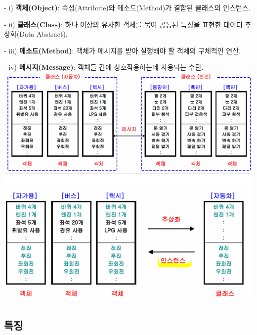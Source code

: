 \documentclass[a4paper,12pt]{article}
\begin{document}
- i) \textbf{객체(Object)}: 속성(Attribute)와 메소드(Method)가 결합된 클래스의 인스턴스.

- ii) \textbf{클래스(Class)}: 하나 이상의 유사한 객체를 묶어 공통된 특성을 표현한 데이터 추상화(Data Abstract).

- iii) \textbf{메소드(Method)}: 객체가 메시지를 받아 실행해야 할 객체의 구체적인 연산.

- iv) \textbf{메시지(Message)}: 객체들 간에 상호작용하는데 사용되는 수단.
\newline
\newline
\includegraphics[scale=0.8]{53}
\newline

\subsection{특징}
\end{document}
